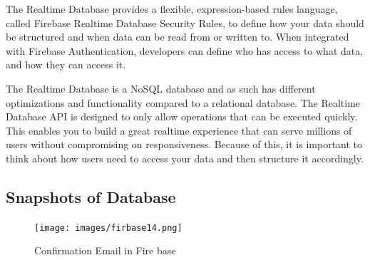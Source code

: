 The Realtime Database provides a flexible, expression-based rules language, called Firebase Realtime Database Security Rules, to define how your data should be structured and when data can be read from or written to. When integrated with Firebase Authentication, developers can define who has access to what data, and how they can access it.

The Realtime Database is a NoSQL database and as such has different optimizations and functionality compared to a relational database. The Realtime Database API is designed to only allow operations that can be executed quickly. This enables you to build a great realtime experience that can serve millions of users without compromising on responsiveness. Because of this, it is important to think about how users need to access your data and then structure it accordingly.



\subsection{Snapshots of Database}

\newpage

\begin{figure}[ht]
\centering
\texttt{[image: images/firbase14.png]}
\caption{Confirmation Email in Fire base}
\end{figure}

